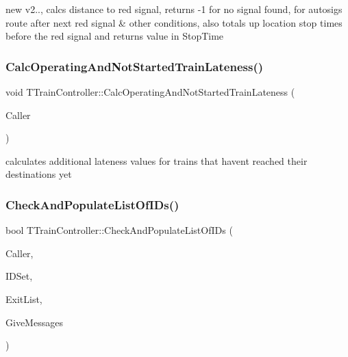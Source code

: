 new v2.., calcs distance to red signal, returns -\/1 for no signal found, for autosigs route after next red signal \& other conditions, also totals up location stop times before the red signal and returns value in Stop\+Time \mbox{\label{class_t_train_controller_aadffada34a23350d7773bc7735e423a1}} 
\subsubsection{\texorpdfstring{Calc\+Operating\+And\+Not\+Started\+Train\+Lateness()}{CalcOperatingAndNotStartedTrainLateness()}}
{\footnotesize\ttfamily void T\+Train\+Controller\+::\+Calc\+Operating\+And\+Not\+Started\+Train\+Lateness (\begin{DoxyParamCaption}\item[{int}]{Caller }\end{DoxyParamCaption})}

calculates additional lateness values for trains that haven\textquotesingle{}t reached their destinations yet \mbox{\label{class_t_train_controller_ae91c1a77699c9daf327938081eab2241}} 
\subsubsection{\texorpdfstring{Check\+And\+Populate\+List\+Of\+I\+Ds()}{CheckAndPopulateListOfIDs()}}
{\footnotesize\ttfamily bool T\+Train\+Controller\+::\+Check\+And\+Populate\+List\+Of\+I\+Ds (\begin{DoxyParamCaption}\item[{int}]{Caller,  }\item[{Ansi\+String}]{I\+D\+Set,  }\item[{T\+Exit\+List \&}]{Exit\+List,  }\item[{bool}]{Give\+Messages }\end{DoxyParamCaption})}

